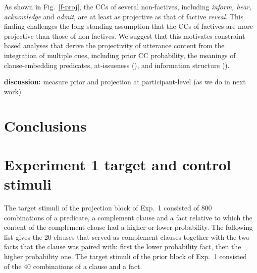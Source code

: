 \documentclass[11pt,fleqn]{article}
\newcommand{\6}{\mbox{$[\hspace*{-.6mm}[$}}
\newcommand{\9}{\mbox{$]\hspace*{-.6mm}]$}}
\begin{document}
As shown in Fig.~\ref{f-proj}, the CCs of several non-factives, including {\em inform, hear, acknowledge} and {\em admit}, are at least as projective as that of factive {\em reveal}. This finding challenges the long-standing assumption that the CCs of factives are more projective than those of non-factives. We suggest that this motivates constraint-based analyses that derive the projectivity of utterance content from the integration of multiple cues, including prior CC probability, the meanings of clause-embedding predicates, at-issueness (\citealt{tbd-variability}), and information structure (\citealt{tonhauser-salt26}).

{\bf discussion:} measure prior and projection at participant-level (as we do in next work)

\section{Conclusions}\label{s5}

\appendix

\setcounter{table}{0}
\renewcommand{\thetable}{A\arabic{table}}

\setcounter{figure}{0}
\renewcommand{\thefigure}{A\arabic{figure}}

\section{Experiment 1 target and control stimuli}\label{a-stim}

The target stimuli of the projection block of Exp.~1 consisted of 800 combinations of a predicate, a complement clause and a fact relative to which the content of the complement clause had a higher or lower probability. The following list gives the 20 clauses that served as complement clauses together with the two facts that the clause was paired with: first the lower probability fact, then the higher probability one. The target stimuli of the prior block of Exp.~1 consisted of the 40 combinations of a clause and a fact.
\end{document}
